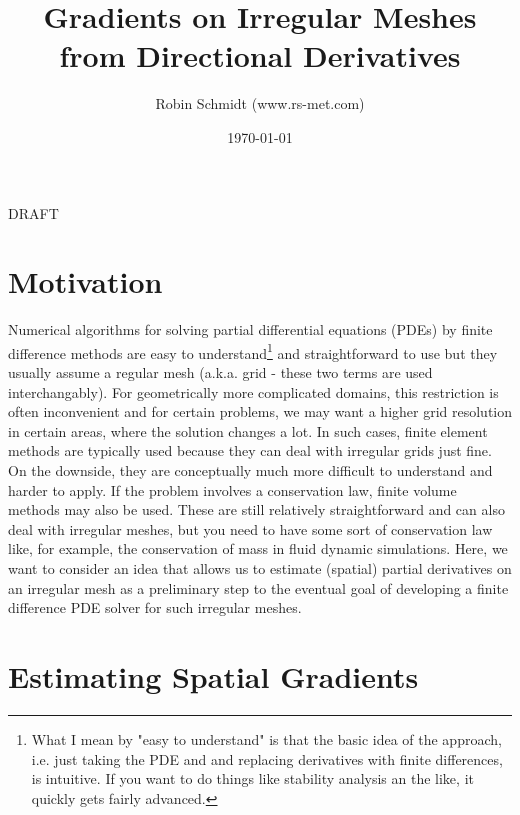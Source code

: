 \title{Gradients on Irregular Meshes from Directional Derivatives}
\author{Robin Schmidt (www.rs-met.com)}
\date{\today}
\maketitle

DRAFT

\section{Motivation}
Numerical algorithms for solving partial differential equations (PDEs) by finite difference methods are easy to understand\footnote{What I mean by "easy to understand" is that the basic idea of the approach, i.e. just taking the PDE and and replacing derivatives with finite differences, is intuitive. If you want to do things like stability analysis an the like, it quickly gets fairly advanced.} and straightforward to use but they usually assume a regular mesh (a.k.a. grid - these two terms are used interchangably). For geometrically more complicated domains, this restriction is often inconvenient and for certain problems, we may want a higher grid resolution in certain areas, where the solution changes a lot. In such cases, finite element methods are typically used because they can deal with irregular grids just fine. On the downside, they are conceptually much more difficult to understand and harder to apply. If the problem involves a conservation law, finite volume methods may also be used. These are still relatively straightforward and can also deal with irregular meshes, but you need to have some sort of conservation law like, for example, the conservation of mass in fluid dynamic simulations. Here, we want to consider an idea that allows us to estimate (spatial) partial derivatives on an irregular mesh as a preliminary step to the eventual goal of developing a finite difference PDE solver for such irregular meshes.


\section{Estimating Spatial Gradients}
